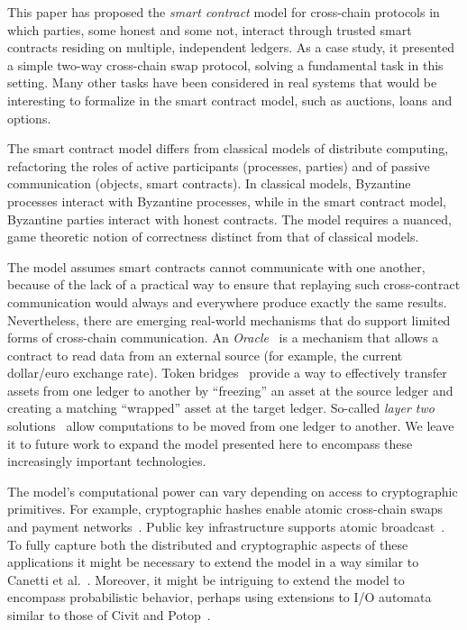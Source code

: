 This paper has proposed the \emph{smart contract} model
for
cross-chain protocols in which  parties, some honest and some not, interact through trusted smart contracts residing on multiple, independent ledgers.
As a case study, it  presented a simple two-way  cross-chain swap protocol, 
solving a fundamental task in this setting.
Many other tasks have been considered in real systems that would be interesting to formalize
in the smart contract model, such  as auctions, loans and options.
  
The smart contract model differs from classical
models of distribute computing,
refactoring the roles of active participants (processes, parties)
and of passive communication (objects, smart contracts).
In classical models,
Byzantine processes interact with Byzantine processes,
while in the smart contract model,
Byzantine parties interact with honest contracts.
The  model requires a nuanced, game theoretic notion of correctness distinct from that of classical models.

The model assumes smart contracts cannot communicate with one another,
because of the lack of a practical way
to ensure that replaying  such cross-contract communication would always
and everywhere produce exactly the same results.
Nevertheless,
there are emerging real-world mechanisms that do support limited
forms of cross-chain communication.
An \emph{Oracle}~\cite{Chainlink} is a mechanism that allows a contract to read data
from an external source (for example, the current dollar/euro exchange rate).
Token bridges~\cite{axelar,Wormhole,layerzero} provide a way to effectively
transfer assets from one ledger to another by ``freezing'' an asset
at the source ledger and creating a matching ``wrapped'' asset at the target ledger.
So-called \emph{layer two} solutions~\cite{rollups,KalodnerGCWF2018,plasma}
allow computations to be moved from one ledger to another.
We leave it to future work to expand the model presented here to encompass
these increasingly important technologies.

The model's computational power can vary depending on access to
cryptographic primitives.
For example,
cryptographic hashes enable atomic cross-chain swaps~\cite{bitcoinwiki,bip199,decred,Herlihy2018,tiersnolan,barterdex,ZakharyAE2019,Catalyst} and payment networks~\cite{DeckerW2015,bolt,HeilmanLG2019,raiden,PoonD2016}.
Public key infrastructure supports atomic broadcast~\cite{Herlihy2018,HerlihyLS2021}.
To fully capture both the distributed and cryptographic aspects of these applications
it might be necessary to extend the model in a way similar to Canetti et al.~\cite{CanettiCKLP07}.
Moreover,
it might be intriguing to extend the model to encompass probabilistic behavior,
perhaps using extensions to I/O automata similar to those of Civit and Potop~\cite{CivitP22b}.    

